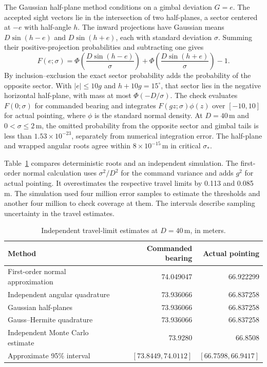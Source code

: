 \documentclass{swmcmthesis}
\begin{document}
The Gaussian half-plane method conditions on a gimbal deviation \(G=e\). The accepted sight vectors lie in the intersection of two half-planes, a sector centered at \(-e\) with half-angle \(h\). The inward projections have Gaussian means \(D\sin(h-e)\) and \(D\sin(h+e)\), each with standard deviation \(\sigma\). Summing their positive-projection probabilities and subtracting one gives
\begin{equation}
\label{eq:q3-half-plane-coverage}
F(e;\sigma)=\Phi\!\left(\frac{D\sin(h-e)}{\sigma}\right)
             +\Phi\!\left(\frac{D\sin(h+e)}{\sigma}\right)-1.
\end{equation}
By inclusion--exclusion the exact sector probability adds the probability of the opposite sector. With \(|e|\le10g\) and \(h+10g=15^\circ\), that sector lies in the negative horizontal half-plane, with mass at most \(\Phi(-D/\sigma)\). The check evaluates \(F(0;\sigma)\) for commanded bearing and integrates \(F(gz;\sigma)\phi(z)\) over \([-10,10]\) for actual pointing, where \(\phi\) is the standard normal density. At \(D=40\,\mathrm m\) and \(0<\sigma\le2\,\mathrm m\), the omitted probability from the opposite sector and gimbal tails is less than \(1.53\times10^{-23}\), separately from numerical integration error. The half-plane and wrapped angular roots agree within \(8\times10^{-15}\,\mathrm m\) in critical \(\sigma_*\).

Table~\ref{tab:q3-alternatives} compares deterministic roots and an independent simulation. The first-order normal calculation uses \(\sigma^2/D^2\) for the command variance and adds \(g^2\) for actual pointing. It overestimates the respective travel limits by 0.113 and 0.085 m. The simulation used four million error samples to estimate the thresholds and another four million to check coverage at them. The intervals describe sampling uncertainty in the travel estimates.

\begin{table}[!htbp]
    \centering
    \caption{Independent travel-limit estimates at \(D=40\,\mathrm m\), in meters.}
    \label{tab:q3-alternatives}
    \begin{tabular}{@{}lrr@{}}
        \toprule
        Method & Commanded bearing & Actual pointing \\
        \midrule
        First-order normal approximation & 74.049047 & 66.922299 \\
        Independent angular quadrature & 73.936066 & 66.837258 \\
        Gaussian half-planes & 73.936066 & 66.837258 \\
        Gauss--Hermite quadrature & 73.936066 & 66.837258 \\
        Independent Monte Carlo estimate & 73.9280 & 66.8508 \\
        \quad Approximate 95\% interval & \([73.8449,74.0112]\) & \([66.7598,66.9417]\) \\
        \bottomrule
    \end{tabular}
\end{table}
\end{document}
